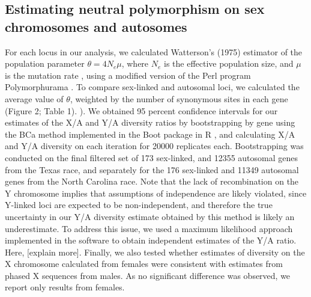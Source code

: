 \documentclass[9pt,twocolumn,twoside]{gsajnl}
\begin{document}
\subsection*{Estimating neutral polymorphism on sex chromosomes and autosomes}
For each locus in our analysis, we calculated Watterson’s (1975) estimator of the population parameter $\theta=4N_{e}\mu$, where $N_{e}$ is the effective population size, and $\mu$ is the mutation rate \citep{watterson1975}, using a modified version of the Perl program Polymorphurama \citep{bachtrog2006}. To compare sex-linked and autosomal loci, we calculated the average value of $\theta$, weighted by the number of synonymous sites in each gene (Figure 2; Table 1). ). We obtained 95 percent confidence intervals for our estimates of the X/A and Y/A diversity ratios by bootstrapping by gene using the BCa method \citep{efron1994} implemented in the Boot package in R \citep{canty2012boot}, and calculating X/A and Y/A diversity on each iteration for 20000 replicates each. Bootstrapping was conducted on the final filtered set of 173 sex-linked, and 12355 autosomal genes from the Texas race, and separately for the 176 sex-linked and 11349 autosomal genes from the North Carolina race. Note that the lack of recombination on the Y chromosome implies that assumptions of independence are likely violated, since Y-linked loci are expected to be non-independent, and therefore the true uncertainty in our Y/A diversity estimate obtained by this method is likely an underestimate. To address this issue, we used a maximum likelihood approach implemented in the software \citep{wright2004hka} to obtain independent estimates of the Y/A ratio. Here, [explain more]. Finally, we also tested whether estimates of diversity on the X chromosome calculated from females were consistent with estimates from phased X sequences from males. As no significant difference was observed, we report only results from females.
\end{document}
